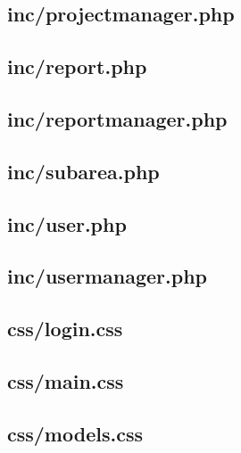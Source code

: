 \documentclass[11pt,a4paper,spanish,twoside]{book}
\begin{document}
\subsection{inc/projectmanager.php}
%

\subsection{inc/report.php}
%

\subsection{inc/reportmanager.php}
%

\subsection{inc/subarea.php}
%

\subsection{inc/user.php}
%

\subsection{inc/usermanager.php}
%

\subsection{css/login.css}
%

\subsection{css/main.css}
%

\subsection{css/models.css}
%
\end{document}
